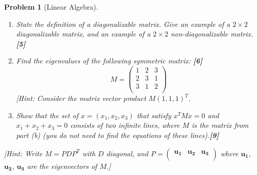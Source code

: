 \documentclass[a4paper]{article}
\theoremstyle{new}
\newtheorem{qns}{Problem}[section]
\begin{document}
\newpage
\begin{qns}[Linear Algebra]\leavevmode
\begin{enumerate}[label=(\alph*)]
\item State the definition of a diagonalizable matrix. Give an example of a $2\times 2$ diagonalizable matrix, and an example of a $2\times 2$ non-diagonalizable matrix. \hfill\textbf{[5]}
\item Find the eigenvalues of the following symmetric matrix: \hfill\textbf{[6]}
$$M=\begin{pmatrix}1&2&3\\2&3&1\\3&1&2\\\end{pmatrix}$$
[Hint: Consider the matrix vector product $M(1,1,1)^T$.
\item Show that the set of $x = (x_1, x_2, x_3)$ that satisfy $x^TMx = 0$ and $x_1 + x_2 + x_3 = 0$ consists of two infinite lines, where $M$ is the matrix from part (b) (you do not need to find the equations of these lines).\hfill\textbf{[9]}
\end{enumerate}
[Hint: Write $M = PDP^T$ with $D$ diagonal, and $P = \begin{pmatrix}\mathbf{u_1}&\mathbf{u_2}&\mathbf{u_3}\\\end{pmatrix}$ where $\mathbf{u_1}$, $\mathbf{u_2}$, $\mathbf{u_3}$ are the eigenvectors of $M$.]
\end{qns}
\end{document}
